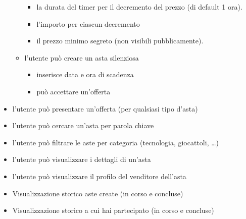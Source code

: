 \begin{itemize}
\begin{itemize}[label={\tiny$\blacksquare$}]
\begin{itemize}[label={\tiny$-$}]
			            \item la durata del timer per il decremento del prezzo (di default 1 ora).
			            \item l'importo per ciascun decremento
			            \item il prezzo minimo segreto (non visibili pubblicamente).
		            \end{itemize}
		      \item l'utente può creare un asta silenziosa
		            \begin{itemize}[label={\tiny$-$}]
			            \item inserisce data e ora di scadenza
			            \item può accettare un'offerta
		            \end{itemize}
	      \end{itemize}

	      \medskip
	\item l'utente può presentare un'offerta (per qualsiasi tipo d'asta) \medskip

	\item l'utente può cercare un'asta per parola chiave
	\item l'utente può filtrare le aste per categoria (tecnologia, giocattoli, …) \medskip

	\item l'utente può visualizzare i dettagli di un'asta
	\item l'utente può visualizzare il profilo del venditore dell'asta \medskip

	\item Visualizzazione storico aste create (in corso e concluse)
	\item Visualizzazione storico a cui hai partecipato (in corso e concluse)
\end{itemize}

\newpage

